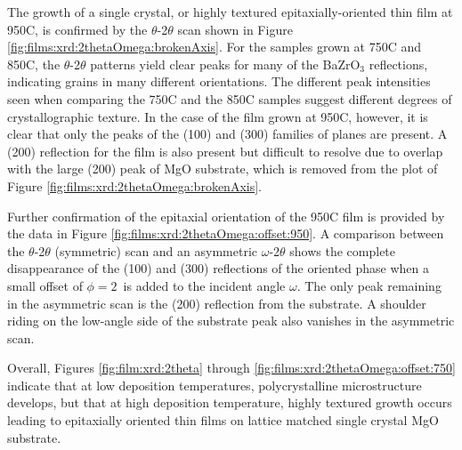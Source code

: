 The growth of a single crystal, or highly textured epitaxially-oriented thin film at 950\textdegree C, is confirmed by the $\theta$-2$\theta$ scan shown in Figure \ref{fig:films:xrd:2thetaOmega:brokenAxis}. For the samples grown at 750\textdegree C and 850\textdegree C, the $\theta$-2$\theta$ patterns yield clear peaks for many of the BaZrO$_3$ reflections, indicating grains in many different orientations. The different peak intensities seen when comparing the 750\textdegree C and the 850\textdegree C samples suggest different degrees of crystallographic texture. In the case of the film grown at 950\textdegree C, however, it is clear that only the peaks of the (100) and (300) families of planes are present. A (200) reflection for the film is also present but difficult to resolve due to overlap with the large (200) peak of MgO substrate, which is removed from the plot of Figure \ref{fig:films:xrd:2thetaOmega:brokenAxis}.

Further confirmation of the epitaxial orientation of the 950\textdegree C film is provided by the data in Figure \ref{fig:films:xrd:2thetaOmega:offset:950}. A comparison between the  $\theta$-2$\theta$ (symmetric) scan and an asymmetric $\omega$-2$\theta$ shows the complete disappearance of the (100) and (300) reflections of the oriented phase when a small offset of $\phi = 2$\textdegree\ is added to the incident angle $\omega$. The only peak remaining in the asymmetric scan is the (200) reflection from the substrate. A shoulder riding on the low-angle side of the substrate peak also vanishes in the asymmetric scan.  

Overall, Figures \ref{fig:film:xrd:2theta} through \ref{fig:films:xrd:2thetaOmega:offset:750} indicate that at low deposition temperatures, polycrystalline microstructure develops, but that at high deposition temperature,  highly textured growth occurs leading to epitaxially oriented thin films on lattice matched single crystal MgO substrate.